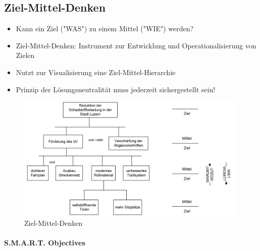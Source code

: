\documentclass[a4paper]{article}
\begin{document}
\newpage
		
		\subsection{Ziel-Mittel-Denken}
		
		\begin{itemize}
			\item Kann ein Ziel ("WAS") zu einem Mittel ("WIE") werden?
			\item Ziel-Mittel-Denken: Instrument zur Entwicklung und Operationalisierung von Zielen
			\item Nutzt zur Visualisierung eine Ziel-Mittel-Hierarchie
			\item Prinzip der Lösungsneutralität muss jederzeit sichergestellt sein!
		\end{itemize}
	
		\begin{figure}[!htb]
			\centering
			\includegraphics[height=6cm]{img/pm/zmd.png}
			\caption{Ziel-Mittel-Denken}
			\label{fig:pm_zmd}
		\end{figure}
	
		\paragraph{S.M.A.R.T. Objectives}
		
\end{document}
